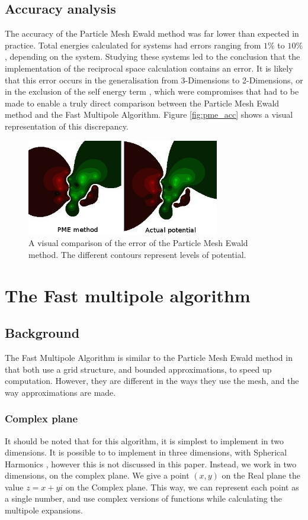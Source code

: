 \documentclass[pdftex,twoside,a4paper]{report}
\newcommand{\bcen}{\begin{center}}
\newcommand{\ecen}{\end{center}}
\newcommand{\pmem}{Particle Mesh Ewald method}
\newcommand{\fma}{Fast Multipole Algorithm}
\begin{document}
\subsection{Accuracy analysis}
The accuracy of the \pmem{} was far lower than expected in practice. Total energies calculated for systems had errors ranging from $1\%$ to $10\%$, depending on the system. Studying these systems led to the conclusion that the implementation of the reciprocal space calculation contains an error. It is likely that this error occurs in the generalisation from 3-Dimensions to 2-Dimensions, or in the exclusion of the self energy term \cite{essmann:8577}, which were compromises that had to be made to enable a truly direct comparison between the \pmem{} and the \fma{}. Figure \ref{fig:pme_acc} shows a visual representation of this discrepancy.
\begin{figure}
\bcen \includegraphics[width=0.75\textwidth]{figures/PMEscreenshot.jpg} \ecen
\caption{A visual comparison of the error of the \pmem{}. The different contours represent levels of potential.}
\label{fig:fig:pme_acc}
\end{figure}
\section{The Fast multipole algorithm}
\subsection{Background}
The \fma{} is similar to the \pmem{} in that both use a grid structure, and bounded approximations, to speed up computation. However, they are different in the ways they use the mesh, and the way approximations are made.
\subsubsection{Complex plane}
It should be noted that for this algorithm, it is simplest to implement in two dimensions. It is possible to to implement in three dimensions, with Spherical Harmonics \cite{Ihler04}, however this is not discussed in this paper. Instead, we work in two dimensions, on the complex plane. We give a point $(x,y)$ on the Real plane the value $z = x + yi$ on the Complex plane. This way, we can represent each point as a single number, and use complex versions of functions while calculating the multipole expansions.
\end{document}
